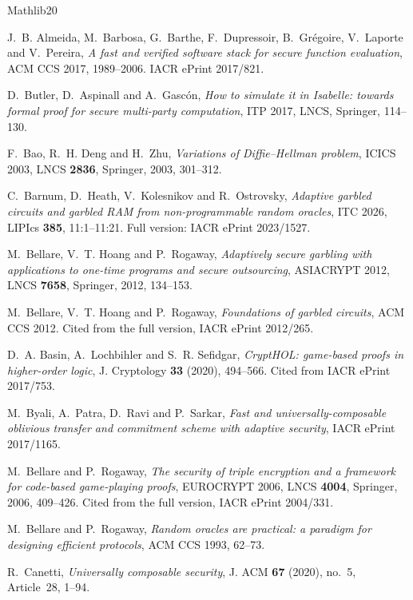 \begin{thebibliography}{Mathlib20}

J.~B. Almeida, M.~Barbosa, G.~Barthe, F.~Dupressoir, B.~Grégoire, V.~Laporte and V.~Pereira,
\emph{A fast and verified software stack for secure function evaluation}, ACM CCS 2017,
1989--2006. IACR ePrint 2017/821.

D.~Butler, D.~Aspinall and A.~Gascón, \emph{How to simulate it in Isabelle: towards formal proof
for secure multi-party computation}, ITP 2017, LNCS, Springer, 114--130.

F.~Bao, R.~H. Deng and H.~Zhu, \emph{Variations of Diffie--Hellman problem}, ICICS 2003,
LNCS \textbf{2836}, Springer, 2003, 301--312.

C.~Barnum, D.~Heath, V.~Kolesnikov and R.~Ostrovsky, \emph{Adaptive garbled circuits and
garbled RAM from non-programmable random oracles}, ITC 2026, LIPIcs \textbf{385}, 11:1--11:21.
Full version: IACR ePrint 2023/1527.

M.~Bellare, V.~T. Hoang and P.~Rogaway, \emph{Adaptively secure garbling with applications to
one-time programs and secure outsourcing}, ASIACRYPT 2012, LNCS \textbf{7658}, Springer, 2012,
134--153.

M.~Bellare, V.~T. Hoang and P.~Rogaway, \emph{Foundations of garbled circuits}, ACM CCS 2012.
Cited from the full version, IACR ePrint 2012/265.

D.~A. Basin, A.~Lochbihler and S.~R. Sefidgar, \emph{CryptHOL: game-based proofs in higher-order
logic}, J. Cryptology \textbf{33} (2020), 494--566. Cited from IACR ePrint 2017/753.

M.~Byali, A.~Patra, D.~Ravi and P.~Sarkar, \emph{Fast and universally-composable oblivious
transfer and commitment scheme with adaptive security}, IACR ePrint 2017/1165.

M.~Bellare and P.~Rogaway, \emph{The security of triple encryption and a framework for code-based
game-playing proofs}, EUROCRYPT 2006, LNCS \textbf{4004}, Springer, 2006, 409--426. Cited from the
full version, IACR ePrint 2004/331.

M.~Bellare and P.~Rogaway, \emph{Random oracles are practical: a paradigm for designing efficient
protocols}, ACM CCS 1993, 62--73.

R.~Canetti, \emph{Universally composable security}, J. ACM \textbf{67} (2020), no.~5, Article~28,
1--94.


\end{thebibliography}
